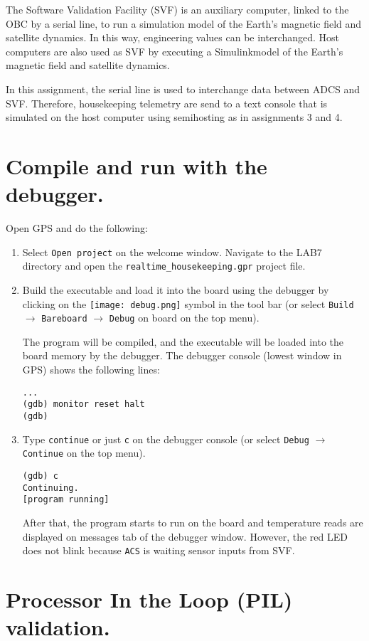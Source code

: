 The Software Validation Facility (SVF) is an auxiliary computer, linked to the OBC by a serial line, to run a simulation model of the Earth's magnetic field and satellite dynamics. In this way, engineering values can be interchanged.
Host computers are also used as SVF by executing a Simulink\texttrademark model of the Earth's magnetic field and satellite dynamics.

In this assignment, the serial line is used to interchange data between ADCS and SVF. Therefore, housekeeping telemetry are send to a text console that is simulated on the host computer using semihosting as in assignments 3 and 4.

\section{Compile and run with the debugger.}

Open GPS and do the following:
\begin{enumerate}
\item Select {\tt Open project} on the welcome window. Navigate to the LAB7 directory and open the {\tt realtime\_housekeeping.gpr} project file.
\item Build the executable and load it into the board using the debugger by clicking on the \hbox{\texttt{[image: debug.png]}} symbol in the tool bar (or select {\tt Build} $\rightarrow$ {\tt Bareboard} $\rightarrow$ {\tt Debug} on board on the top menu).

The program will be compiled, and the executable will be loaded into the board memory by the debugger. The debugger console (lowest window in GPS) shows the following lines:
\begin{verbatim}
...
(gdb) monitor reset halt
(gdb)
\end{verbatim}

\item Type {\tt continue} or just {\tt c} on the debugger console (or select {\tt Debug} $\rightarrow$ {\tt Continue} on the top menu).
\begin{verbatim}
(gdb) c
Continuing.
[program running]
\end{verbatim}

After that, the program starts to run on the board and temperature reads are displayed on messages tab of the debugger window. However, the red LED does not blink because {\tt ACS} is waiting sensor inputs from SVF.
\end{enumerate}

\section{Processor In the Loop (PIL) validation.}

